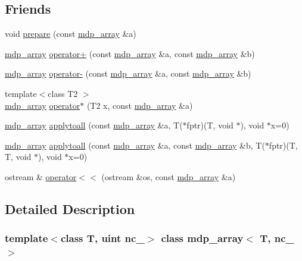 \subsection*{Friends}
\begin{DoxyCompactItemize}
\item 
void \hyperlink{classmdp__array_a7c12113e8b61f3906ff4d15a6cc10fe2}{prepare} (const \hyperlink{classmdp__array}{mdp\+\_\+array} \&a)
\item 
\hyperlink{classmdp__array}{mdp\+\_\+array} \hyperlink{classmdp__array_a0456c0c6d5e305cc0799ceb7b8639539}{operator+} (const \hyperlink{classmdp__array}{mdp\+\_\+array} \&a, const \hyperlink{classmdp__array}{mdp\+\_\+array} \&b)
\item 
\hyperlink{classmdp__array}{mdp\+\_\+array} \hyperlink{classmdp__array_a97528690c485585f95cfad74e934e621}{operator-\/} (const \hyperlink{classmdp__array}{mdp\+\_\+array} \&a, const \hyperlink{classmdp__array}{mdp\+\_\+array} \&b)
\item 
{\footnotesize template$<$class T2 $>$ }\\\hyperlink{classmdp__array}{mdp\+\_\+array} \hyperlink{classmdp__array_a534b82292f55812fcd8b9c7c11fb2837}{operator$\ast$} (T2 x, const \hyperlink{classmdp__array}{mdp\+\_\+array} \&a)
\item 
\hyperlink{classmdp__array}{mdp\+\_\+array} \hyperlink{classmdp__array_a720a0f3e6c74893b0bb90ddb85e2c7cf}{applytoall} (const \hyperlink{classmdp__array}{mdp\+\_\+array} \&a, T($\ast$fptr)(T, void $\ast$), void $\ast$x=0)
\item 
\hyperlink{classmdp__array}{mdp\+\_\+array} \hyperlink{classmdp__array_af47ee2aa085a0ca303f6eb960be0b257}{applytoall} (const \hyperlink{classmdp__array}{mdp\+\_\+array} \&a, const \hyperlink{classmdp__array}{mdp\+\_\+array} \&b, T($\ast$fptr)(T, T, void $\ast$), void $\ast$x=0)
\item 
ostream \& \hyperlink{classmdp__array_a5b84c698961f9276308a57923daf4458}{operator$<$$<$} (ostream \&os, const \hyperlink{classmdp__array}{mdp\+\_\+array} \&a)
\end{DoxyCompactItemize}


\subsection{Detailed Description}
\subsubsection*{template$<$class T, uint nc\+\_\+$>$\newline
class mdp\+\_\+array$<$ T, nc\+\_\+ $>$}

